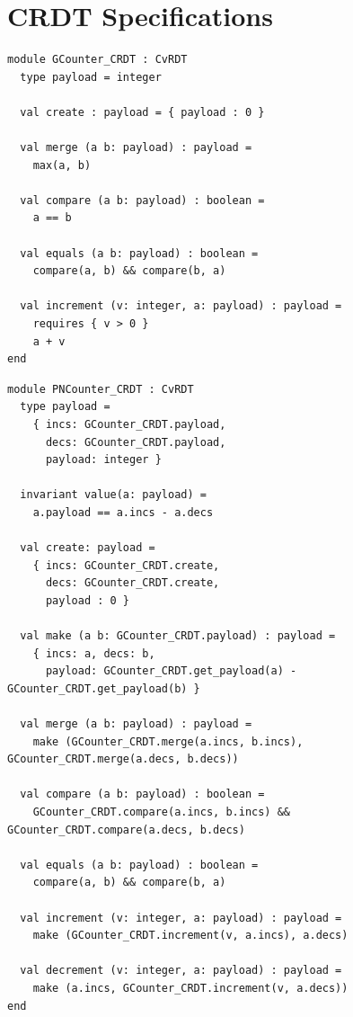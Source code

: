 %

\chapter{CRDT Specifications}
\label{app:crdt_specifications}

\begin{lstlisting}[caption={\texttt{GCounter\_CRDT}}, label={lst:app_gcounter}]
module GCounter_CRDT : CvRDT
  type payload = integer

  val create : payload = { payload : 0 }

  val merge (a b: payload) : payload =
    max(a, b)

  val compare (a b: payload) : boolean =
    a == b

  val equals (a b: payload) : boolean =
    compare(a, b) && compare(b, a)

  val increment (v: integer, a: payload) : payload =
    requires { v > 0 }
    a + v
end
\end{lstlisting}

\begin{lstlisting}[caption={\texttt{PNCounter\_CRDT}}, label={lst:app_pncounter}]
module PNCounter_CRDT : CvRDT
  type payload =
    { incs: GCounter_CRDT.payload,
      decs: GCounter_CRDT.payload,
      payload: integer }

  invariant value(a: payload) =
    a.payload == a.incs - a.decs

  val create: payload =
    { incs: GCounter_CRDT.create,
      decs: GCounter_CRDT.create,
      payload : 0 }

  val make (a b: GCounter_CRDT.payload) : payload =
    { incs: a, decs: b,
      payload: GCounter_CRDT.get_payload(a) - GCounter_CRDT.get_payload(b) }

  val merge (a b: payload) : payload =
    make (GCounter_CRDT.merge(a.incs, b.incs), GCounter_CRDT.merge(a.decs, b.decs))

  val compare (a b: payload) : boolean = 
    GCounter_CRDT.compare(a.incs, b.incs) && GCounter_CRDT.compare(a.decs, b.decs)

  val equals (a b: payload) : boolean =
    compare(a, b) && compare(b, a)

  val increment (v: integer, a: payload) : payload =
    make (GCounter_CRDT.increment(v, a.incs), a.decs)

  val decrement (v: integer, a: payload) : payload =
    make (a.incs, GCounter_CRDT.increment(v, a.decs))
end
\end{lstlisting}

